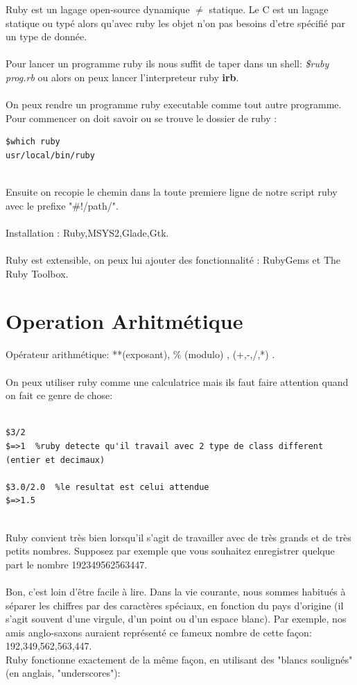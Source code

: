 \documentclass[a4paper,12pt,openany]{book}
\begin{document}
Ruby est un lagage open-source dynamique $\neq$ statique. Le C est un lagage statique ou typé alors qu'avec ruby les objet n'on pas besoins d'etre spécifié par un type de donnée.\\
\\
Pour lancer un programme ruby ils nous suffit de taper dans un shell: \emph{\$ruby prog.rb} ou alors on peux lancer l'interpreteur ruby \textbf{irb}.\\
\\
On peux rendre un programme ruby executable comme tout autre programme. Pour commencer on doit savoir ou se trouve le dossier de ruby :\\
\begin{verbatim}
$which ruby
usr/local/bin/ruby     
\end{verbatim}
\\
Ensuite on recopie le chemin dans la toute premiere ligne de notre script ruby avec le prefixe "#!/path/".\\
\\
Installation : Ruby,MSYS2,Glade,Gtk.\\
\\
Ruby est extensible, on peux lui ajouter des fonctionnalité : RubyGems et The Ruby Toolbox.\\


\section{Operation Arhitmétique}

Opérateur arithmétique: **(exposant), \% (modulo) , (+,-,/,*) .\\
\\
On peux utiliser ruby comme une calculatrice mais ils faut faire attention quand on fait ce genre de chose:\\
\\
\begin{verbatim}
$3/2
$=>1  %ruby detecte qu'il travail avec 2 type de class different (entier et decimaux)

$3.0/2.0  %le resultat est celui attendue
$=>1.5
\end{verbatim}
\\
Ruby convient très bien lorsqu'il s'agit de travailler avec de très grands et de très petits nombres. Supposez par exemple que vous souhaitez enregistrer quelque part le nombre 192349562563447.\\
\\
Bon, c'est loin d'être facile à lire. Dans la vie courante, nous sommes habitués à séparer les chiffres par des caractères spéciaux, en fonction du pays d'origine (il s'agit souvent d'une virgule, d'un point ou d'un espace blanc). Par exemple, nos amis anglo-saxons auraient représenté ce fameux nombre de cette façon: 192,349,562,563,447.\\
Ruby fonctionne exactement de la même façon, en utilisant des "blancs soulignés" (en anglais, "underscores"):\\ 
\end{document}
